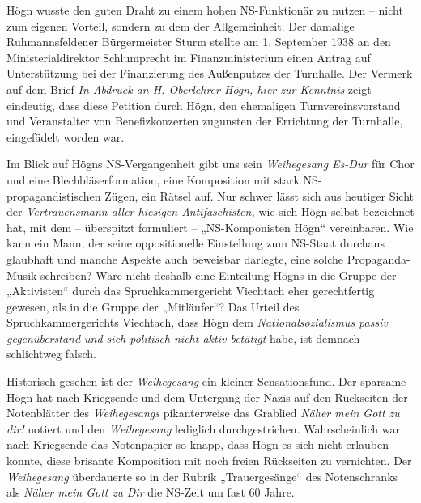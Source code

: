 \documentclass{book}
\begin{document}
Högn wusste den guten Draht zu einem hohen NS-Funktionär zu nutzen –
nicht zum eigenen Vorteil, sondern zu dem der Allgemeinheit. Der
damalige Ruhmannsfeldener Bürgermeister Sturm stellte am 1. September
1938 an den Ministerialdirektor Schlumprecht im Finanzministerium einen
Antrag auf Unterstützung bei der Finanzierung des Außenputzes der
Turnhalle. Der Ver\-merk auf dem Brief \textit{In Abdruck an H.
Oberlehrer Högn, hier zur Kenntnis} zeigt ein\-deutig, dass diese
Petition durch Högn, den ehemaligen Turnvereinsvorstand und
Veranstalter von Benefizkonzerten zugunsten der Errichtung der
Turn\-halle, eingefädelt worden war.

Im Blick auf Högns NS-Vergangenheit gibt uns sein \textit{Weihegesang
Es-Dur} für Chor und eine Blechbläserformation, eine Komposition mit
stark NS-propa\-gandistischen Zügen, ein Rätsel auf. Nur schwer lässt
sich aus heutiger Sicht der \textit{Vertrauensmann aller hiesigen
Antifaschisten,} wie sich Högn selbst bezeichnet hat, mit dem –
überspitzt formuliert – „NS-Komponisten Högn“ vereinbaren. Wie kann ein
Mann, der seine oppositionelle Einstellung zum NS-Staat durch\-aus
glaubhaft und manche Aspekte auch beweisbar darlegte, eine solche
Pro\-paganda-Musik schreiben? Wäre nicht deshalb eine Einteilung Högns
in die Gruppe der „Aktivisten“ durch das Spruchkammergericht Viechtach
eher ge\-rechtfertig gewesen, als in die Gruppe der „Mitläufer“? Das
Urteil des Spruch\-kammergerichts Viechtach, dass Högn dem
\textit{Nationalsozialismus passiv gegenüber\-stand und sich politisch
nicht aktiv betätigt} habe, ist demnach schlichtweg falsch.


Historisch gesehen ist der \textit{Weihegesang} ein kleiner
Sensationsfund. Der sparsame Högn hat nach Kriegsende und dem Untergang
der Nazis auf den Rückseiten der Notenblätter des \textit{Weihegesangs}
pikanterweise das Grablied \textit{Näher mein Gott zu dir!} notiert und
den \textit{Weihegesang} lediglich durchgestrichen. Wahr\-scheinlich
war nach Kriegsende das Notenpapier so knapp, dass Högn es sich nicht
erlauben konnte, diese brisante Komposition mit noch freien Rückseiten
zu vernichten. Der \textit{Weihegesang} überdauerte so in der Rubrik
„Trauergesänge“ des Notenschranks als \textit{Näher mein Gott zu Dir}
die NS-Zeit um fast 60 Jahre.
\end{document}

